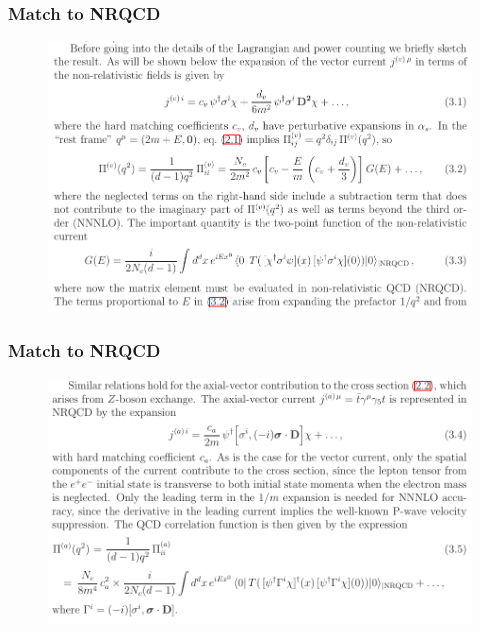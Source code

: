 \documentclass[8pt,dvipsnames,table]{beamer}
\begin{document}
\begin{frame}
	\frametitle{Match to NRQCD}

	\begin{figure}[!htb]
		\centering
		\includegraphics[width=\linewidth]{image22.png}
		\label{fig:image22}
	\end{figure}


\end{frame}

\begin{frame}
	\frametitle{Match to NRQCD}

	\begin{figure}[!htb]
		\centering
		\includegraphics[width=\linewidth]{image23.png}
		\label{fig:image23}
	\end{figure}


\end{frame}
\end{document}
